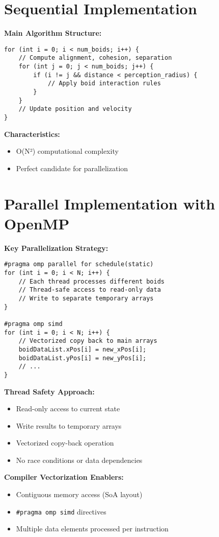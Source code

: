 \section{Sequential Implementation}

\textbf{Main Algorithm Structure:}
\begin{lstlisting}[style=cppstyle]
for (int i = 0; i < num_boids; i++) {
    // Compute alignment, cohesion, separation
    for (int j = 0; j < num_boids; j++) {
        if (i != j && distance < perception_radius) {
            // Apply boid interaction rules
        }
    }
    // Update position and velocity
}
\end{lstlisting}

\textbf{Characteristics:}
\begin{itemize}
    \item O(N²) computational complexity
    \item Perfect candidate for parallelization
\end{itemize}

\section{Parallel Implementation with OpenMP}

\textbf{Key Parallelization Strategy:}
\begin{lstlisting}[style=cppstyle]
#pragma omp parallel for schedule(static)
for (int i = 0; i < N; i++) {
    // Each thread processes different boids
    // Thread-safe access to read-only data
    // Write to separate temporary arrays
}

#pragma omp simd
for (int i = 0; i < N; i++) {
    // Vectorized copy back to main arrays
    boidDataList.xPos[i] = new_xPos[i];
    boidDataList.yPos[i] = new_yPos[i];
    // ...
}
\end{lstlisting}

\textbf{Thread Safety Approach:}
\begin{itemize}
    \item Read-only access to current state
    \item Write results to temporary arrays
    \item Vectorized copy-back operation
    \item No race conditions or data dependencies
\end{itemize}

\textbf{Compiler Vectorization Enablers:}
\begin{itemize}
    \item Contiguous memory access (SoA layout)
    \item \texttt{\#pragma omp simd} directives
    \item Multiple data elements processed per instruction
\end{itemize}